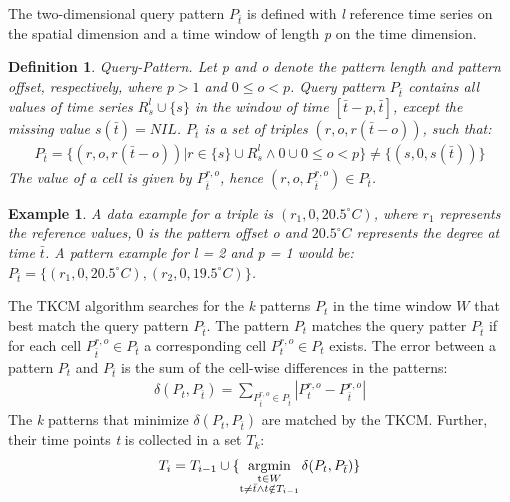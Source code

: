\documentclass[abstracton,12pt]{scrreprt}
\begin{document}
The two-dimensional query pattern $P_{\bar{t}}$ is defined with \emph{l} reference time series on the spatial dimension and a time window of length \emph{p} on the time dimension.
\newtheorem{defn}{Definition}[section]
\begin{defn}
	Query-Pattern. Let p and o denote the pattern length and pattern offset, respectively, where $p > 1$ and $0 \leq o < p$. Query pattern $P_{\bar{t}}$ contains all values of time series $R_s^l \cup \{s\}$ in the window of time $[\bar{t} - p, \bar{t}]$, except the missing value $s(\bar{t}) = NIL$. $P_{\bar{t}}$ is a set of triples $(r,o,r( \bar{t}-o))$, such that:
	\begin{align*}
P_{\bar{t}}=\{(r,o,r( \bar{t}-o))| r \in \{s\} \cup R_s^l \land 0 \cup 0 \leq o < p\} \ne \{(s,0,s(\bar{t}))\}
	\end{align*}
	The value of a cell is given by $P_{\bar{t}}^{r,o}$, hence $(r, o, P_{\bar{t}}^{r,o}) \in P_{\bar{t}}$.
\end{defn}
\newtheorem{exmp}{Example}[section]
\begin{exmp}
A data example for a triple is $(r_1,0,20.5^{\circ}C)$, where $r_1$ represents the reference values, $0$ is the pattern offset \emph{o} and $20.5^{\circ}C$ represents the degree at time $\bar{t}$. A pattern example for l = 2 and p = 1 would be: $P_{\bar{t}}=\{(r_1,0,20.5^{\circ}C),(r_2,0,19.5^{\circ}C)\}$.
\end{exmp}
The TKCM algorithm searches for the \emph{k} patterns $P_t$ in the time window $W$ that best match the query pattern $P_{\bar{t}}$. The pattern $P_t$ matches the query patter $P_{\bar{t}}$ if for each cell $P_{\bar{t}}^{r,o} \in P_{\bar{t}}$ a corresponding cell  $P_{t}^{r,o} \in P_t$ exists. The error between a pattern $P_t$ and $P_{\bar{t}}$  is the sum of the cell-wise differences in the patterns:
\begin{align*}
\delta(P_{t}, P_{\bar{t}}) = \displaystyle\sum_{P_{\bar{t}}^{r,o} \in P_{\bar{t}}}^{} |P_{t}^{r,o} - P_{\bar{t}}^{r,o}|
\end{align*}
The \emph{k} patterns that minimize $\delta(P_{t}, P_{\bar{t}})$ are matched by the TKCM. Further, their time points \emph{t} is collected in a set $T_k$:
\newcommand*{\argmin}{\operatornamewithlimits{argmin}\limits}
\begin{align*}
T_i = T_{i-1} \cup \{\argmin_{%
	\substack{%
		\text t \in W \\
		\text t \neq \bar{t} \wedge t \notin T_{i-1}
	}
}	\delta(P_{t}, P_{\bar{t}})\}
\end{align*}
\end{document}
